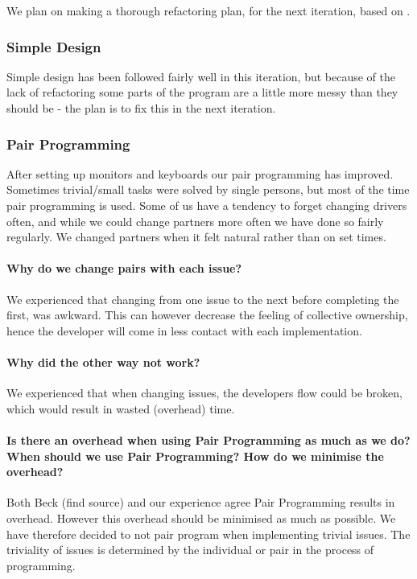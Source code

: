 We plan on making a thorough refactoring plan, for the next iteration, based on \citet{fowler:refac}.


\subsubsection{Simple Design}
Simple design has been followed fairly well in this iteration, but because of the lack of refactoring some parts of the program are a little more messy than they should be - the plan is to fix this in the next iteration.

\subsubsection{Pair Programming}
After setting up monitors and keyboards our pair programming has improved. Sometimes trivial/small tasks were solved by single persons, but most of the time pair programming is used.
Some of us have a tendency to forget changing drivers often, and while we could change partners more often we have done so fairly regularly. We changed partners when it felt natural rather than on set times.

\paragraph{Why do we change pairs with each issue?}
We experienced that changing from one issue to the next before completing the first, was awkward.
This can however decrease the feeling of collective ownership, hence the developer will come in less contact with each implementation.

\paragraph{Why did the other way not work?}
We experienced that when changing issues, the developers flow could be broken, which would result in wasted (overhead) time.

\paragraph{Is there an overhead when using Pair Programming as much as we do? When should we use Pair Programming? How do we minimise the overhead?}
Both Beck (find source) and our experience agree Pair Programming results in overhead.
However this overhead should be minimised as much as possible. We have therefore decided to not pair program when implementing trivial issues. The triviality of issues is determined by the individual or pair in the process of programming.

